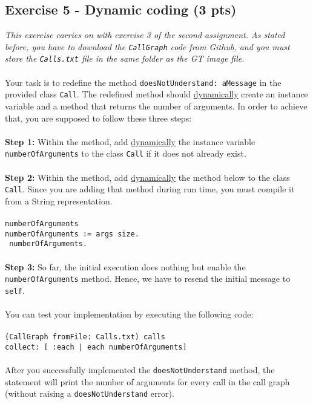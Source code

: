 \documentclass [11pt, a4wide, twoside]{article}
\begin{document}
\subsection*{Exercise 5 - Dynamic coding (3 pts)}
\emph{This exercise carries on with exercise 3 of the second assignment.
As stated before, you have to download the \texttt{CallGraph} code from Github, and you must store the \texttt{Calls.txt} file in the same folder as the GT image file.}\\\\
Your task is to redefine the method \texttt{doesNotUnderstand: aMessage} in the provided class \texttt{Call}.
The redefined method should \underline{dynamically} create an instance variable and a method that returns the number of arguments.
In order to achieve that, you are supposed to follow these three steps:\\\\
\textbf{Step 1:} Within the method, add \underline{dynamically} the instance variable \texttt{numberOfArguments} to the class \texttt{Call} if it does not already exist.\\\\
\textbf{Step 2:} Within the method, add \underline{dynamically} the method below to the class \texttt{Call}. Since you are adding that method during run time, you must compile it from a String representation.\\\\
\texttt{numberOfArguments\\
numberOfArguments := args size.\\
\caret~numberOfArguments.}\\\\
\textbf{Step 3:} So far, the initial execution does nothing but enable the \texttt{numberOfArguments} method. Hence, we have to resend the initial message to \texttt{self}.\\\\
You can test your implementation by executing the following code:\\\\
\texttt{(CallGraph fromFile: \textquotesingle Calls.txt\textquotesingle) calls \\
\hspace*{0.5cm}collect: [ :each | each numberOfArguments]}\\\\
After you successfully implemented the \texttt{doesNotUnderstand} method, the statement will print the number of arguments for every call in the call graph (without raising a \texttt{doesNotUnderstand} error).
\end{document}
